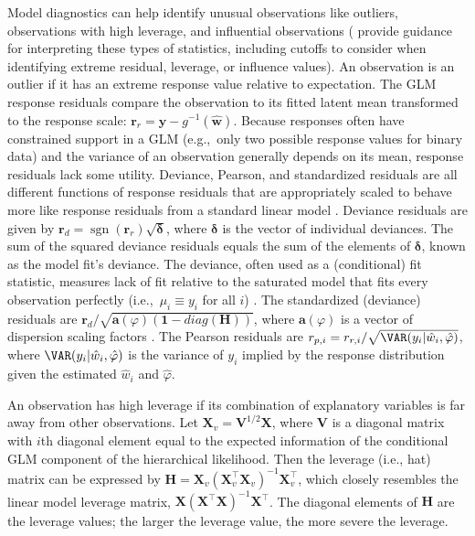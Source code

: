 \documentclass[
]{jss}
\begin{document}
Model diagnostics can help identify unusual observations like outliers,
observations with high leverage, and influential observations
(\citet{montgomery2021introduction} provide guidance for interpreting
these types of statistics, including cutoffs to consider when
identifying extreme residual, leverage, or influence values). An
observation is an outlier if it has an extreme response value relative
to expectation. The GLM response residuals compare the observation to
its fitted latent mean transformed to the response scale:
\(\mathbf{r}_{r} = \mathbf{y} - g^{-1}(\hat{\mathbf{w}})\). Because
responses often have constrained support in a GLM (e.g.,~only two
possible response values for binary data) and the variance of an
observation generally depends on its mean, response residuals lack some
utility. Deviance, Pearson, and standardized residuals are all different
functions of response residuals that are appropriately scaled to behave
more like response residuals from a standard linear model
\citep{myers2012generalized}. Deviance residuals are given by
\(\mathbf{r}_{d} = \operatorname{sgn}(\mathbf{r}_{r})\sqrt{\boldsymbol{\delta}}\),
where \(\boldsymbol{\delta}\) is the vector of individual deviances. The
sum of the squared deviance residuals equals the sum of the elements of
\(\boldsymbol{\delta}\), known as the model fit's deviance. The
deviance, often used as a (conditional) fit statistic, measures lack of
fit relative to the saturated model that fits every observation
perfectly (i.e.,~\(\mu_{i} \equiv y_i\) for all \(i\))
\citep{mccullagh1989generalized}. The standardized (deviance) residuals
are
\(\mathbf{r}_{d}/\sqrt{\mathbf{a}(\varphi)(\mathbf{1} - diag(\mathbf{H}))}\),
where \(\mathbf{a}(\varphi)\) is a vector of dispersion scaling factors
\citep{faraway2016extending}. The Pearson residuals are
\(r_{p,i} = r_{r,i}/\sqrt{\VAR(y_i | \hat{w}_i, \hat{\varphi})}\), where
\(\VAR(y_i | \hat{w}_i, \hat{\varphi})\) is the variance of \(y_i\)
implied by the response distribution given the estimated \(\hat{w}_i\)
and \(\hat{\varphi}\).

An observation has high leverage if its combination of explanatory
variables is far away from other observations. Let
\(\mathbf{X}_v = \mathbf{V}^{1/2} \mathbf{X}\), where \(\mathbf{V}\) is
a diagonal matrix with \(i\)th diagonal element equal to the expected
information of the conditional GLM component of the hierarchical
likelihood. Then the leverage (i.e., hat) matrix can be expressed by
\(\mathbf{H} = \mathbf{X}_v(\mathbf{X}_v^\top \mathbf{X}_v)^{-1}\mathbf{X}_v^\top\),
which closely resembles the linear model leverage matrix,
\(\mathbf{X}(\mathbf{X}^\top \mathbf{X})^{-1}\mathbf{X}^\top\). The
diagonal elements of \(\mathbf{H}\) are the leverage values; the larger
the leverage value, the more severe the leverage.
\end{document}
